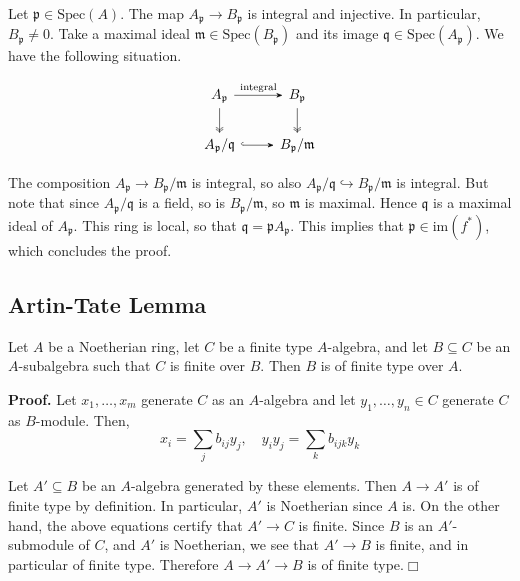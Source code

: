 \documentclass{template}
\newcommand{\qedwhite}{\hfill \ensuremath{\Box}}
\begin{document}
Let $\mathfrak{p} \in \text{Spec}(A)$. The map $A_{\mathfrak{p}} \to
B_{\mathfrak{p}}$ is integral and injective. In particular, $B_{\mathfrak{p}}
\neq 0$. Take a maximal ideal $\mathfrak{m} \in \text{Spec}(B_{\mathfrak{p}})$
and its image $\mathfrak{q} \in \text{Spec}(A_{\mathfrak{p}})$. We have 
the following situation.

\[
    \begin{tikzcd}
        A_{\mathfrak{p}} \arrow[-Stealth]{r}{\text{integral}}\arrow[-Stealth, two heads]{d}{} & B_{\mathfrak{p}}\arrow[-Stealth, two heads]{d}{} \\
        A_{\mathfrak{p}}/\mathfrak{q} \arrow[-Stealth, hook]{r}{} & B_{\mathfrak{p}}/\mathfrak{m}
    \end{tikzcd}
\]

The composition $A_{\mathfrak{p}} \to B_{\mathfrak{p}}/\mathfrak{m}$ is
integral, so also $A_{\mathfrak{p}}/\mathfrak{q} \hookrightarrow
B_{\mathfrak{p}}/\mathfrak{m}$ is integral. But note that since
$A_{\mathfrak{p}}/\mathfrak{q}$ is a field, so is
$B_{\mathfrak{p}}/\mathfrak{m}$, so $\mathfrak{m}$ is maximal. Hence
$\mathfrak{q}$ is a maximal ideal of $A_{\mathfrak{p}}$. This ring is local, so
that $\mathfrak{q}=\mathfrak{p}A_{\mathfrak{p}}$. This implies that
$\mathfrak{p} \in \text{im}(f^*)$, which concludes the proof.


\subsection{Artin-Tate Lemma}

\begin{lemma}
    Let $A$ be a Noetherian ring, let $C$ be a finite type $A$-algebra, and let 
    $B \subseteq C$ be an $A$-subalgebra such that $C$ is finite over $B$. Then 
    $B$ is of finite type over $A$.
\end{lemma}

\textbf{Proof.} Let $x_1,\dots,x_m$ generate $C$ as an $A$-algebra and let
$y_1,\dots,y_n \in C$ generate $C$ as $B$-module. Then,
\begin{equation*}
    x_i = \sum_j b_{ij}y_j, \quad y_iy_j = \sum_k b_{ijk}y_k
\end{equation*}

Let $A' \subseteq B$ be an $A$-algebra generated by these elements. Then $A \to
A'$ is of finite type by definition. In particular, $A'$ is Noetherian since $A$
is. On the other hand, the above equations certify that $A' \to C$ is finite.
Since $B$ is an $A'$-submodule of $C$, and $A'$ is Noetherian, we see that $A'
\to B$ is finite, and in particular of finite type. Therefore $A \to A' \to B$
is of finite type.\qedwhite
\end{document}
